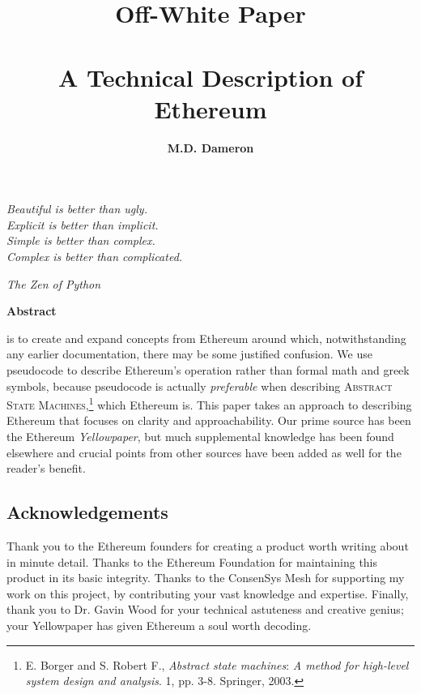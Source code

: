 \documentclass[10pt,a4paper,leqno,bibliography=totoc]{scrartcl}
\author{\textbf{M.D. Dameron}}
\title{\Huge{Off-White Paper} \\ \hfill \\ \Large{A Technical Description of Ethereum}}
\newenvironment{alphafootnotes}
{\par\edef\savedfootnotenumber{\number\value{footnote}}
\renewcommand{\thefootnote}{\alph{footnote}}
\setcounter{footnote}{0}}
{\par\setcounter{footnote}{\savedfootnotenumber}}
\begin{document}

	\begin{alphafootnotes}

	\pagecolor{blanchedalmond}

	\maketitle

	\epigraph{\textsl{Beautiful is better than ugly. \\
	Explicit is better than implicit. \\
	Simple is better than complex. \\
	Complex is better than complicated.
	}}{\textit{The Zen of Python}}


\hfill \hfill
\begin{center}\textbf{Abstract}\end{center}\par
	 is to create and expand concepts from Ethereum around which, notwithstanding any earlier documentation, there may be some justified confusion. We use pseudocode to describe Ethereum's operation rather than formal math and greek symbols, because pseudocode is actually \textit{preferable} when describing \textsc{Abstract State Machines},\footnote{E. Borger and S. Robert F., \textit{Abstract state machines}:\textsl{ A method for high-level system design and analysis}. 1, pp. 3-8. Springer, 2003.} which Ethereum is. This paper takes an approach to describing Ethereum that focuses on clarity and approachability. Our prime source has been the Ethereum \textit{Yellowpaper}, but much supplemental knowledge has been found elsewhere and crucial points from other sources have been added as well for the reader's benefit.
	

\clearpage

\begin{center}\section*{Acknowledgements}\end{center}

 Thank you to the Ethereum founders for creating a product worth writing about in minute detail. Thanks to the Ethereum Foundation for maintaining this product in its basic integrity. Thanks to the ConsenSys Mesh for supporting my work on this project, by contributing your vast knowledge and expertise. Finally, thank you to Dr. Gavin Wood for your technical astuteness and creative genius; your Yellowpaper has given Ethereum a soul worth decoding.


\end{alphafootnotes}
\end{document}
